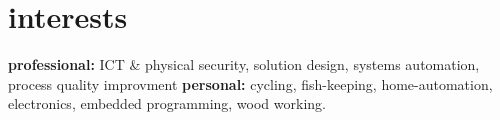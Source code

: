 \documentclass[]{friggeri-cv} %
\begin{document}

\section{interests}

\textbf{professional:} ICT \& physical security, solution design, systems automation, process quality improvment \textbf{personal:} cycling, fish-keeping, home-automation, electronics, embedded programming, wood working.

\end{document}

